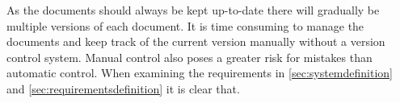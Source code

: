 As the documents should always be kept up-to-date there will gradually be multiple versions of each document.
It is time consuming to manage the documents and keep track of the current version manually without a version control system.
Manual control also poses a greater risk for mistakes than automatic control.
When examining the requirements in \cref{sec:systemdefinition} and \cref{sec:requirementsdefinition} it is clear that.
